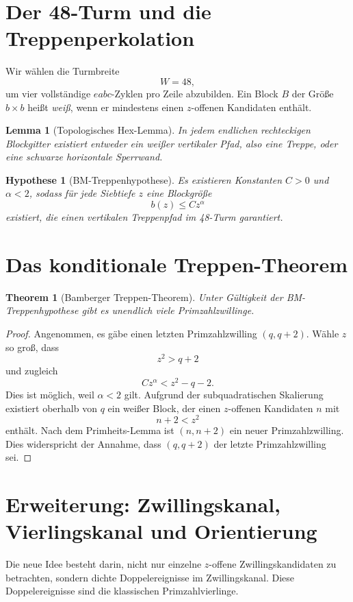 \documentclass[11pt,a4paper]{article}
\newtheorem{theorem}{Theorem}
\newtheorem{lemma}{Lemma}
\newtheorem{hypothesis}{Hypothese}
\theoremstyle{definition}
\begin{document}
\section{Der 48-Turm und die Treppenperkolation}

Wir wählen die Turmbreite
\[
W=48,
\]
um vier vollständige $eabc$-Zyklen pro Zeile abzubilden. Ein Block $B$ der Größe $b\times b$ heißt \emph{weiß}, wenn er mindestens einen $z$-offenen Kandidaten enthält.

\begin{lemma}[Topologisches Hex-Lemma]
In jedem endlichen rechteckigen Blockgitter existiert entweder ein weißer vertikaler Pfad, also eine Treppe, oder eine schwarze horizontale Sperrwand.
\end{lemma}

\begin{hypothesis}[BM-Treppenhypothese]
Es existieren Konstanten $C>0$ und $\alpha<2$, sodass für jede Siebtiefe $z$ eine Blockgröße
\[
b(z)\leq C z^\alpha
\]
existiert, die einen vertikalen Treppenpfad im 48-Turm garantiert.
\end{hypothesis}

\section{Das konditionale Treppen-Theorem}

\begin{theorem}[Bamberger Treppen-Theorem]
Unter Gültigkeit der BM-Treppenhypothese gibt es unendlich viele Primzahlzwillinge.
\end{theorem}

\begin{proof}
Angenommen, es gäbe einen letzten Primzahlzwilling $(q,q+2)$. Wähle $z$ so groß, dass
\[
z^2>q+2
\]
und zugleich
\[
Cz^\alpha<z^2-q-2.
\]
Dies ist möglich, weil $\alpha<2$ gilt. Aufgrund der subquadratischen Skalierung existiert oberhalb von $q$ ein weißer Block, der einen $z$-offenen Kandidaten $n$ mit
\[
n+2<z^2
\]
enthält. Nach dem Primheits-Lemma ist $(n,n+2)$ ein neuer Primzahlzwilling. Dies widerspricht der Annahme, dass $(q,q+2)$ der letzte Primzahlzwilling sei.
\end{proof}

\section{Erweiterung: Zwillingskanal, Vierlingskanal und Orientierung}

Die neue Idee besteht darin, nicht nur einzelne $z$-offene Zwillingskandidaten zu betrachten, sondern dichte Doppelereignisse im Zwillingskanal. Diese Doppelereignisse sind die klassischen Primzahlvierlinge.
\end{document}
